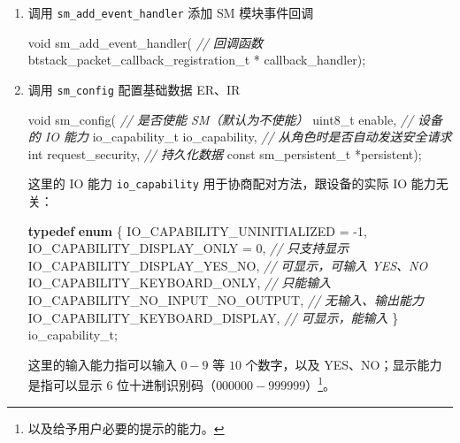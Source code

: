 \documentclass[
  12pt,
]{book}
\newenvironment{Shaded}{\begin{snugshade}}{\end{snugshade}}
\newcommand{\CommentTok}[1]{\textcolor[rgb]{0.56,0.35,0.01}{\textit{#1}}}
\newcommand{\DataTypeTok}[1]{\textcolor[rgb]{0.13,0.29,0.53}{#1}}
\newcommand{\DecValTok}[1]{\textcolor[rgb]{0.00,0.00,0.81}{#1}}
\newcommand{\KeywordTok}[1]{\textcolor[rgb]{0.13,0.29,0.53}{\textbf{#1}}}
\newcommand{\NormalTok}[1]{#1}
\begin{document}
\begin{enumerate}
\def\labelenumi{\arabic{enumi}.}
\item
  调用 \texttt{sm\_add\_event\_handler} 添加 SM 模块事件回调

\begin{Shaded}
\begin{Highlighting}[]
\DataTypeTok{void}\NormalTok{ sm_add_event_handler(}
  \CommentTok{// 回调函数}
\NormalTok{  btstack_packet_callback_registration_t * callback_handler);}
\end{Highlighting}
\end{Shaded}
\item
  调用 \texttt{sm\_config} 配置基础数据 ER、IR

\begin{Shaded}
\begin{Highlighting}[]
\DataTypeTok{void}\NormalTok{ sm_config(}
  \CommentTok{// 是否使能 SM（默认为不使能）}
  \DataTypeTok{uint8_t}\NormalTok{ enable,}
  \CommentTok{// 设备的 IO 能力}
\NormalTok{  io_capability_t io_capability,}
  \CommentTok{// 从角色时是否自动发送安全请求}
  \DataTypeTok{int}\NormalTok{   request_security,}
  \CommentTok{// 持久化数据}
  \DataTypeTok{const}\NormalTok{ sm_persistent_t *persistent);}
\end{Highlighting}
\end{Shaded}

  这里的 IO 能力 \texttt{io\_capability} 用于协商配对方法，跟设备的实际 IO 能力无关：

\begin{Shaded}
\begin{Highlighting}[]
\KeywordTok{typedef} \KeywordTok{enum}\NormalTok{ \{}
\NormalTok{  IO_CAPABILITY_UNINITIALIZED = -}\DecValTok{1}\NormalTok{,}
\NormalTok{  IO_CAPABILITY_DISPLAY_ONLY = }\DecValTok{0}\NormalTok{,   }\CommentTok{// 只支持显示}
\NormalTok{  IO_CAPABILITY_DISPLAY_YES_NO,     }\CommentTok{// 可显示，可输入 YES、NO}
\NormalTok{  IO_CAPABILITY_KEYBOARD_ONLY,      }\CommentTok{// 只能输入}
\NormalTok{  IO_CAPABILITY_NO_INPUT_NO_OUTPUT, }\CommentTok{// 无输入、输出能力}
\NormalTok{  IO_CAPABILITY_KEYBOARD_DISPLAY,   }\CommentTok{// 可显示，能输入}
\NormalTok{\} io_capability_t;}
\end{Highlighting}
\end{Shaded}

  这里的输入能力指可以输入 \(0-9\) 等 \(10\) 个数字，以及 YES、NO；显示能力是指可以显示 6 位十进制识别码（\(000000-999999\)）\footnote{以及给予用户必要的提示的能力。}。


\end{enumerate}
\end{document}
